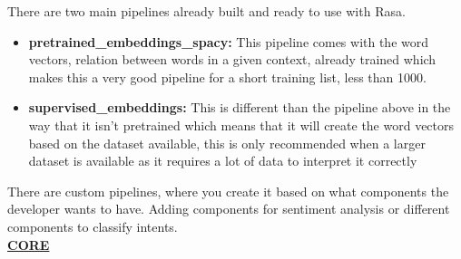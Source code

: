 There are two main pipelines already built and ready to use with Rasa.
\begin{itemize}
	\item {\textbf{pretrained\_embeddings\_spacy:} This pipeline comes with the word vectors, relation between words in a given context, already trained which makes this a very good pipeline for a short training list, less than 1000.}
	\item {\textbf{supervised\_embeddings:} This is different than the pipeline above in the way that it isn’t pretrained which means that it will create the word vectors based on the dataset available, this is only recommended when a larger dataset is available as it requires a lot of data to interpret it correctly
		}
\end{itemize}
There are custom pipelines, where you create it based on what components the developer wants to have. Adding components for sentiment analysis or different components to classify intents.\\

\textbf{\underline{CORE}}\\

